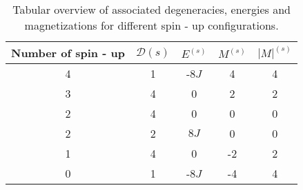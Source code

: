 \begin{table}[h!]
    \centering
    \caption{Tabular overview of associated degeneracies, energies and magnetizations for different spin - up configurations.}
    \begin{tabular}{c|c|c|c|c}
         \hline 
         Number of spin - up & $\mathcal{D}(s)$ & $E^{(s)}$ & $M^{(s)}$ & $|M|^{(s)}$ \\
         \hline
         4 & 1 & -$8J$ & 4 & 4\\
         3 & 4 & 0 & 2 & 2\\
         2 & 4 & 0 & 0 & 0\\
         2 & 2 & $8J$ & 0 & 0\\
         1 & 4 & 0 & -2 & 2\\
         0 & 1 & -$8J$ & -4 & 4\\
         \hline
    \end{tabular}
    
    \label{tab:latticevals}
\end{table}

